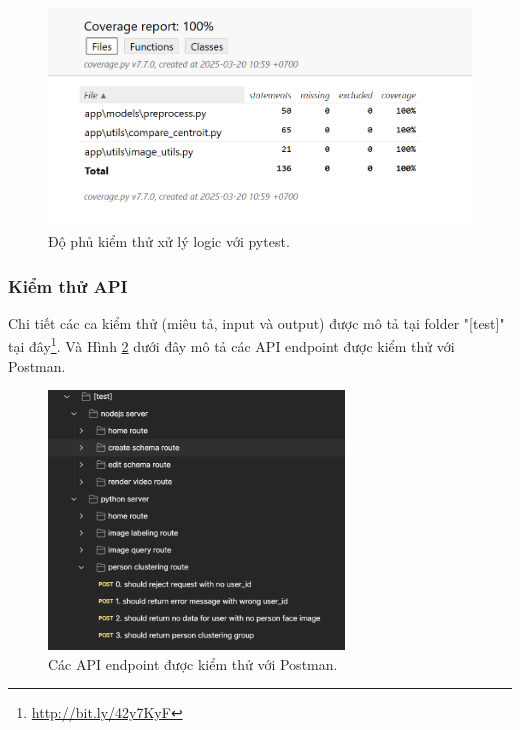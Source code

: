 
\begin{figure}[H]
    \centering  
    \includegraphics[width=1\textwidth]{figures/c4/4-3/pytest_2.png}
    \caption{Độ phủ kiểm thử xử lý logic với pytest.}
    \label{fig:pytest-testing}
\end{figure}


\subsubsection{Kiểm thử API}

Chi tiết các ca kiểm thử (miêu tả, input và output) được mô tả tại folder "[test]" tại đây\footnote{\url{http://bit.ly/42y7KyF}}. 
Và Hình \ref{fig:postman} dưới đây mô tả các API endpoint được kiểm thử với Postman\cite{postman}.  

\begin{figure}[H]
    \centering  
    \includegraphics[width=0.7\textwidth]{figures/c4/4-3/api.png}
    \caption{Các API endpoint được kiểm thử với Postman.}
    \label{fig:postman}
\end{figure}


